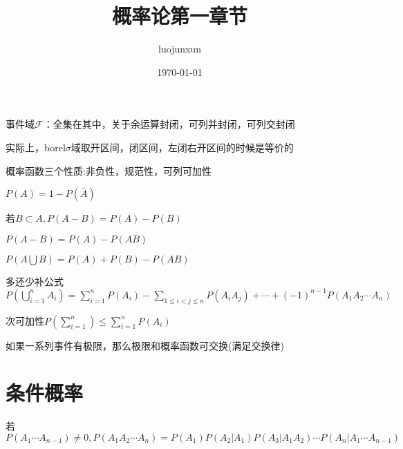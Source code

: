 \documentclass[12pt, a4paper, oneside]{ctexart}
\title{\huge\textbf{概率论第一章节}}
\author{luojunxun}
\date{\today}
\begin{document}
\maketitle

事件域$\mathscr{F}$：全集在其中，关于余运算封闭，可列并封闭，可列交封闭

实际上，borel$\sigma$域取开区间，闭区间，左闭右开区间的时候是等价的

概率函数三个性质:非负性，规范性，可列可加性

$P(A) = 1-P(\bar{A}) $

若$B\subset A,P(A-B) =P(A)-P(B)  $

$P(A-B)=P(A)-P(AB)$

$P(A\bigcup B)=P(A) +P(B)-P(AB) $

多还少补公式$P(\bigcup_{i=1}^nA_i)=\sum\limits_{i=1}^nP(A_i) -\sum\limits_{1\leq i<j\leq n}P(A_iA_j)+\cdots+(-1)^{n-1}P(A_1A_2\cdots A_n) $

次可加性$P(\sum\limits_{i=1}^n)\leq \sum\limits_{i=1}^n P(A_i) $

如果一系列事件有极限，那么极限和概率函数可交换(满足交换律)

\section*{条件概率}

若$P(A_1\cdots A_{n-1})\neq 0,P(A_1A_2\cdots A_n)=P(A_1)P(A_2|A_1)P(A_3|A_1A_2)\cdots P(A_n|A_1\cdots A_{n-1}) $
























% 
% 
\end{document}
